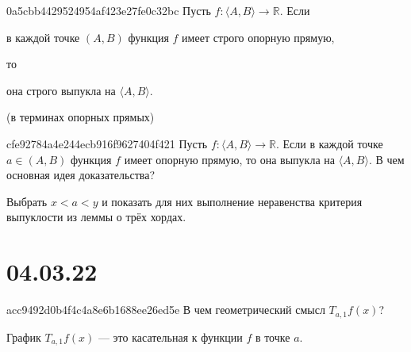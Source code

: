 \begin{note}{0a5cbb4429524954af423e27fe0c32bc}
    Пусть \({ f : \langle A, B \rangle \to \mathbb R }\).
    Если \begin{icloze}{2}в каждой точке \({ (A, B) }\) функция \({ f }\) имеет строго опорную прямую,\end{icloze} то \begin{icloze}{1}она строго выпукла на \({ \langle A, B \rangle }\).\end{icloze}

    \begin{center}
        \tiny
        (в терминах опорных прямых)
    \end{center}
\end{note}

\begin{note}{cfe92784a4e244ecb916f9627404f421}
    Пусть \({ f : \langle A, B \rangle \to \mathbb R }\).
    Если в каждой точке \({ a \in (A, B) }\) функция \({ f }\) имеет опорную прямую, то она выпукла на \({ \langle A, B \rangle }\).
    В чем основная идея доказательства?

    \begin{cloze}{1}
        Выбрать \({ x < a < y }\) и показать для них выполнение неравенства критерия выпуклости из леммы о трёх хордах.
    \end{cloze}
\end{note}

\section{04.03.22}
\begin{note}{acc9492d0b4f4c4a8e6b1688ee26ed5e}
    В чем геометрический смысл \( T_{a, 1} f(x) \)?

    \begin{cloze}{1}
        График \( T_{a, 1} f(x) \) --- это касательная к функции \( f \) в точке \( a \).
    \end{cloze}
\end{note}

